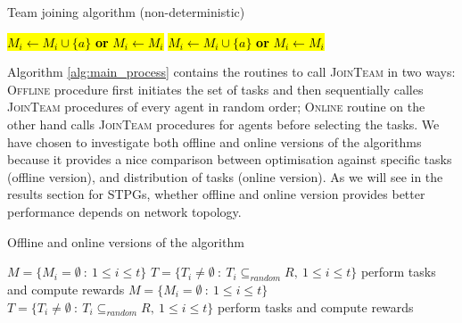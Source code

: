 \documentclass{llncs}
\begin{document}
\begin{algorithm}[H]
\caption{Team joining algorithm (non-deterministic)}
\label{alg:join_team_nondet}
\begin{scriptsize}
\begin{algorithmic}
     
       
	 
	    \State \hl{$M_i \leftarrow M_i \cup \{a\}$  \textbf{or} $M_i \leftarrow M_i$} 
	\EndIf
       
	 
	  \State \hl{$M_i \leftarrow M_i \cup \{a\}$ \textbf{or} $M_i \leftarrow M_i$} 
	\EndIf
      \EndIf
    \EndIf
  \EndFor
\EndProcedure
\end{algorithmic}
\end{scriptsize}
\end{algorithm}

Algorithm \ref{alg:main_process} contains the routines to call \textsc{JoinTeam} in two ways: \textsc{Offline} procedure first initiates the set of tasks and then sequentially calles \textsc{JoinTeam} procedures of every agent in random order; \textsc{Online} routine on the other hand calls \textsc{JoinTeam} procedures for agents before selecting the tasks. We have chosen to investigate both offline and online versions of the algorithms because it provides a nice comparison between optimisation against specific tasks (offline version), and distribution of tasks (online version). As we will see in the results section for STPGs, whether offline and online version provides better performance depends on network topology.


\begin{algorithm}[H]
\caption{Offline and online versions of the algorithm}
\label{alg:main_process}
\begin{scriptsize}
\begin{algorithmic}
 
  \State $M = \{M_i = \emptyset\ :\ 1\leq i \leq t\}$ 
  \State $T = \{T_i\neq \emptyset\ :\ T_i \subseteq_{random} R,\ 1\leq i \leq t\}$ 
    \State {}
  \EndFor
  \State perform tasks and compute rewards
\EndProcedure
\Statex
{} 
  \State $M = \{M_i = \emptyset\ :\ 1\leq i \leq t\}$ 
    \State {}
  \EndFor
  \State $T = \{T_i\neq \emptyset\ :\ T_i \subseteq_{random} R,\ 1\leq i \leq t\}$ 
  \State perform tasks and compute rewards
\EndProcedure
\end{algorithmic}
\end{scriptsize}
\end{algorithm}
\end{document}

